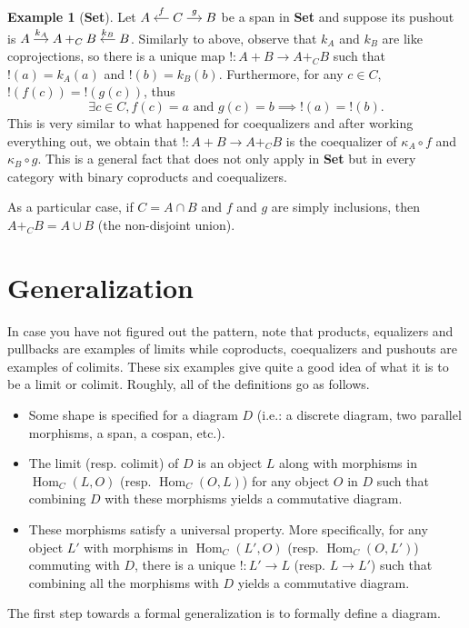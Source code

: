 \documentclass{article}
\theoremstyle{definition}
\newtheorem{exmp}[thm]{Example}
\theoremstyle{remark}
\DeclareMathOperator{\Hom}{Hom}
\begin{document}
\begin{exmp}[\textbf{Set}]
    Let $\begin{tikzcd}[cramped, sep=small]A & C \arrow[l, "f"'] \arrow[r, "g"]& B \end{tikzcd}$ be a span in \textbf{Set} and suppose its pushout is $\begin{tikzcd}[cramped, sep=small] A \arrow[r, "k_A"] & A+_C B & B \arrow[l, "k_B"'] \end{tikzcd}$. Similarly to above, observe that $k_A$ and $k_B$ are like coprojections, so there is a unique map $!: A+ B \rightarrow A+_C B$ such that $!(a) = k_A(a)$ and $!(b) = k_B(b)$. Furthermore, for any $c \in C$, $!(f(c)) = !(g(c))$, thus 
    \[\exists c \in C, f(c)=a \text{ and } g(c) = b \implies !(a) = !(b).\]
    This is very similar to what happened for coequalizers and after working everything out, we obtain that $!:A+B \rightarrow A +_C B$ is the coequalizer of $\kappa_A \circ f$ and $\kappa_B \circ g$. This is a general fact that does not only apply in \textbf{Set} but in every category with binary coproducts and coequalizers.

    As a particular case, if $C = A\cap B$ and $f$ and $g$ are simply inclusions, then $A +_C B = A\cup B$ (the non-disjoint union).
\end{exmp}
\section{Generalization}
In case you have not figured out the pattern, note that products, equalizers and pullbacks are examples of limits while coproducts, coequalizers and pushouts are examples of colimits. These six examples give quite a good idea of what it is to be a limit or colimit. Roughly, all of the definitions go as follows.
\begin{itemize}
    \item Some shape is specified for a diagram $D$ (i.e.: a discrete diagram, two parallel morphisms, a span, a cospan, etc.).
    \item The limit (resp. colimit) of $D$ is an object $L$ along with morphisms in $\Hom_C(L,O)$ (resp. $\Hom_C(O,L)$) for any object $O$ in $D$ such that combining $D$ with these morphisms yields a commutative diagram.
    \item These morphisms satisfy a universal property. More specifically, for any object $L'$ with morphisms in $\Hom_C(L',O)$ (resp. $\Hom_C(O,L')$) commuting with $D$, there is a unique $!:L'\rightarrow L$ (resp. $L \rightarrow L'$) such that combining all the morphisms with $D$ yields a commutative diagram.
\end{itemize}
The first step towards a formal generalization is to formally define a diagram.
\end{document}
